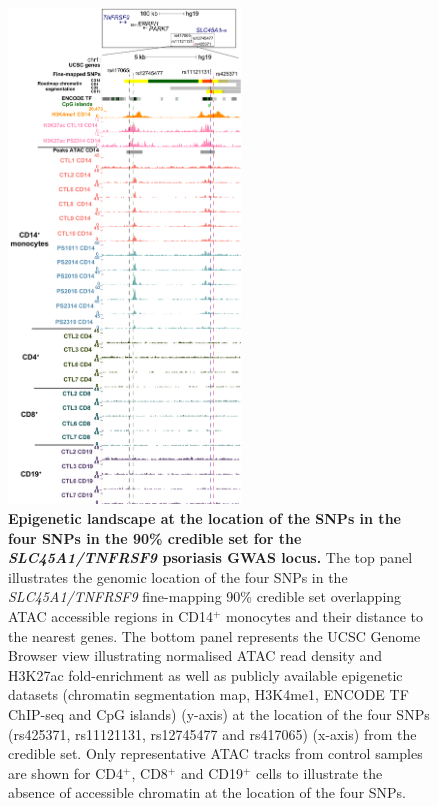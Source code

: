 \begin{figure}[htbp]
\centering
\includegraphics[width=0.55\textwidth]{./Results2/pdfs/UCSC_TNFRSF9_credible_set_track}
\caption[Epigenetic landscape at the location of the SNPs in the four SNPs in the 90\% credible set for the \textit{SLC45A1/TNFRSF9} psoriasis GWAS locus.]{\textbf{Epigenetic landscape at the location of the SNPs in the four SNPs in the 90\% credible set for the \textit{SLC45A1/TNFRSF9} psoriasis GWAS locus.} The top panel illustrates the genomic location of the four SNPs in the \textit{SLC45A1/TNFRSF9} fine-mapping 90\% credible set overlapping ATAC accessible regions in CD14$^+$ monocytes and their distance to the nearest genes. The bottom panel represents the UCSC Genome Browser view illustrating normalised ATAC read density and H3K27ac fold-enrichment as well as publicly available epigenetic datasets (chromatin segmentation map, H3K4me1, ENCODE TF ChIP-seq and CpG islands) (y-axis) at the location of the four SNPs (rs425371, rs11121131, rs12745477 and rs417065) (x-axis) from the credible set. Only representative ATAC tracks from control samples are shown for CD4$^+$, CD8$^+$ and CD19$^+$ cells to illustrate the absence of accessible chromatin at the location of the four SNPs.}
\label{figure:ATAC_PS_CTL_TNFSF9_FM}
\end{figure}





